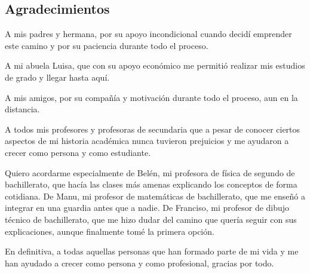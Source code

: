 \begin{flushright}
\section*{Agradecimientos}
A mis padres y hermana, por su apoyo incondicional cuando decidí emprender este camino y por su paciencia durante todo el proceso.

A mi abuela Luisa, que con su apoyo económico me permitió realizar mis estudios de grado y llegar hasta aquí. 

A mis amigos, por su compañía y motivación durante todo el proceso, aun en la distancia.

A todos mis profesores y profesoras de secundaria que a pesar de conocer ciertos aspectos de mi historia académica nunca 
tuvieron prejuicios y me ayudaron a crecer como persona y como estudiante. 

Quiero acordarme especialmente de Belén, mi profesora de física de segundo de bachillerato, que hacía las clases más amenas explicando los conceptos de forma cotidiana.
De Manu, mi profesor de matemáticas de bachillerato, que me enseñó a integrar en una guardia antes que a nadie.
De Franciso, mi profesor de dibujo técnico de bachillerato, que me hizo dudar del camino que quería seguir con sus explicaciones, aunque finalmente tomé la primera opción.

En definitiva, a todas aquellas personas que han formado parte de mi vida y me han ayudado a crecer como persona y como profesional, gracias por todo.
\par\end{flushright}

